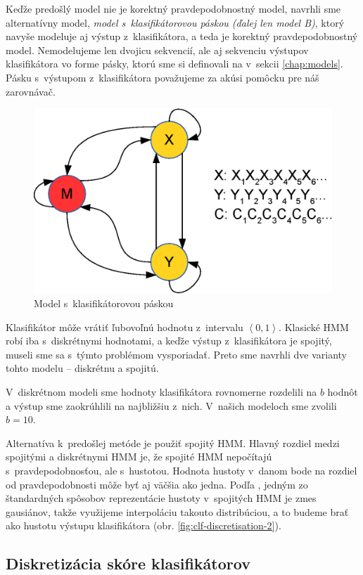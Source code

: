 Keďže predošlý model nie je korektný pravdepodobnostný model, navrhli sme alternatívny model, \textit{model s~klasifikátorovou páskou (ďalej len model B)}, ktorý navyše modeluje aj výstup z~klasifikátora, a teda je korektný pravdepodobnostný model.
Nemodelujeme len dvojicu sekvencií, ale aj sekvenciu výstupov klasifikátora vo forme pásky, ktorú sme si definovali na v~sekcii \ref{chap:models}.
Pásku s~výstupom z~klasifikátora považujeme za akúsi pomôcku pre náš zarovnávač.
\begin{figure}[htp]
    \centering
    \includegraphics[width=.5\textwidth]{images/model_clf_paska}
    \caption{Model s~klasifikátorovou páskou}
\end{figure}
Klasifikátor môže vrátiť ľubovoľnú hodnotu z~intervalu $\left<0,1 \right>$. Klasické HMM robí iba s~diskrétnymi hodnotami, a keďže výstup z~klasifikátora je spojitý, museli sme sa s~týmto problémom vysporiadať. Preto sme navrhli dve varianty tohto modelu -- diskrétnu a spojitú.

V~diskrétnom modeli sme hodnoty klasifikátora rovnomerne rozdelili na $b$ hodnôt a výstup sme zaokrúhlili na najbližšiu z~nich. V~našich modeloch sme zvolili $b=10$.

Alternatíva k~predošlej metóde je použiť spojitý HMM. Hlavný rozdiel medzi spojitými a diskrétnymi HMM je, že spojité HMM nepočítajú s~pravdepodobnosťou, ale s~hustotou. Hodnota hustoty v~danom bode na rozdiel od pravdepodobnosti môže byť aj väčšia ako jedna. Podľa  \cite{huang1989multiple}, jedným zo štandardných spôsobov reprezentácie hustoty v~spojitých HMM je zmes gausiánov, takže využijeme interpoláciu takouto distribúciou, a to budeme brať ako hustotu výstupu klasifikátora (obr. \ref{fig:clf-discretisation-2}).



\subsection{Diskretizácia skóre klasifikátorov}

